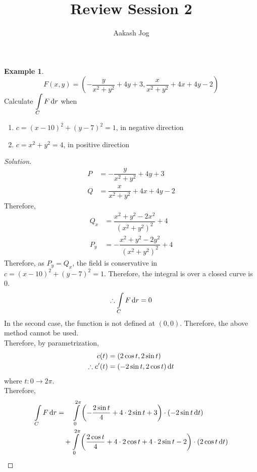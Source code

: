 \documentclass[fleqn, a4paper, 12pt]{article}
\title{Review Session 2}
\author{Aakash Jog}
\date{\formatdate{4}{2}{2015}}
\theoremstyle{definition}
\newtheorem{example}{Example}
\theoremstyle{theorem}
\theoremstyle{remark}
\newenvironment{solution}
{\begin{proof}[Solution]\let\qed\relax}
	{\end{proof}}
\begin{document}
	
\maketitle

\begin{example}
	\begin{equation*}
		F(x,y) = \left( - \dfrac{y}{x^2 + y^2} + 4y + 3 , \dfrac{x}{x^2 + y^2} + 4x + 4y - 2 \right)
	\end{equation*}
	Calculate $\displaystyle \int\limits_{C} F \dif r$ when
	\begin{enumerate}
		\item $c = (x - 10)^2 + (y - 7)^2 = 1$, in negative direction
		\item $c = x^2 + y^2 = 4$, in positive direction
	\end{enumerate}
\end{example}

\begin{solution}
	\begin{align*}
		P &= -\dfrac{y}{x^2 + y^2} + 4y + 3\\
		Q &= \dfrac{x}{x^2 + y^2} + 4x + 4y - 2
	\end{align*}
	Therefore,
	\begin{align*}
		Q_x &= \dfrac{x^2 + y^2 - 2x^2}{(x^2 + y^2)^2} + 4\\
		P_y &= -\dfrac{x^2 + y^2 - 2y^2}{(x^2 + y^2)^2} + 4
	\end{align*}
	Therefore, as $P_y = Q_x$, the field is conservative in $c = (x - 10)^2 + (y - 7)^2 = 1$. Therefore, the integral is over a closed curve is $0$.
	\begin{equation*}
		\therefore \int\limits_{C} F \dif r = 0
	\end{equation*}
	In the second case, the function is not defined at $(0,0)$. Therefore, the above method cannot be used.\\
	Therefore, by parametrization,
	\begin{align*}
		c(t) &= (2 \cos t, 2 \sin t)\\
		\therefore c'(t) &= (-2 \sin t, 2 \cos t) \dif t
	\end{align*}
	where $t : 0 \to 2 \pi$.\\
	Therefore,
	\begin{align*}
		\int\limits_{C} F \dif r &= \quad \int\limits_{0}^{2 \pi} \left( -\dfrac{2 \sin t}{4} + 4 \cdot 2 \sin t + 3 \right) \cdot (-2 \sin t \dif t) \\
		&\quad+ \int\limits_{0}^{2 \pi} \left( \dfrac{2 \cos t}{4} + 4 \cdot 2 \cos t + 4 \cdot 2 \sin t - 2 \right) \cdot (2 \cos t \dif t)
	\end{align*}
\end{solution}
\end{document}
